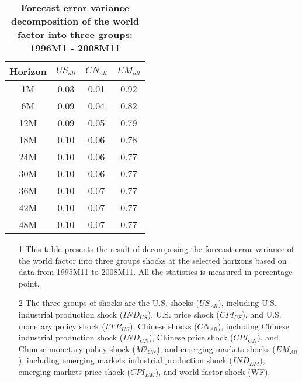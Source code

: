 \documentclass[12pt]{article}
\numberwithin{equation}{section}
\begin{document}
\begin{table}[htbp]
    \centering
\caption{\textbf{Forecast error variance decomposition of the world factor into three groups: 1996M1 - 2008M11}}

     \begin{tabularx}{\textwidth}{@{\extracolsep{\fill}}cccc}
    \hline\hline
Horizon	&	$US_{all}$	&					$CN_{all}$	&					$EM_{all}$	\\	\hline
1M	&	0.03 	&					0.01 	&					0.92 					\\
6M	&	0.09 	&					0.04 	&					0.82 					\\
12M	&	0.09 	&					0.05 	&					0.79 					\\
18M	&	0.10 	&					0.06 	&					0.78 					\\
24M	&	0.10 	&					0.06 	&					0.77 					\\
30M	&	0.10 	&					0.06 	&					0.77 					\\
36M	&	0.10 	&					0.07 	&					0.77 					\\
42M	&	0.10 	&					0.07 	&					0.77 					\\
48M	&	0.10 	&					0.07 	&					0.77 					\\
\hline\hline
    \end{tabularx}%
  \label{tab:vd_before_3}%

\begin{minipage}{\textwidth}
{	\begin{itemize}

\item[1] This table presents the result of decomposing the forecast error variance of the world factor into three groups shocks at the selected horizons based on data from 1995M11 to 2008M11. All the statistics is measured in percentage point.
\item[2] The three groups of shocks are  the U.S. shocks ($US_{All}$), including U.S. industrial production shock ($IND_{US}$), U.S. price shock ($CPI_{US}$), and U.S. monetary policy shock ($FFR_{US}$), Chinese shocks ($CN_{All}$), including Chinese industrial production shock ($IND_{CN}$), Chinese price shock ($CPI_{CN}$), and Chinese monetary policy shock ($M2_{CN}$), and emerging markets shocks ($EM_{All}$), including emerging markets industrial production shock ($IND_{EM}$), emerging markets price shock ($CPI_{EM}$), and world factor shock (WF).
\end{itemize}

}
\end{minipage}

\end{table}%
\end{document}
